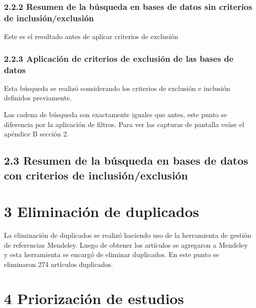 \subsubsection*{2.2.2 Resumen de la búsqueda en bases de datos sin criterios de inclusión/exclusión}
\label{subsubsec:resumenBusqueda}
Este es el resultado antes de aplicar criterios de exclusión




\subsubsection*{2.2.3	Aplicación de criterios de exclusión de las bases de datos}
Esta búsqueda se realizó considerando los criterios de exclusión e inclusión definidos previamente.

Las cadena de búsqueda son exactamente iguales que antes, este punto se diferencia por la aplicación de 
filtros. Para ver las capturas de pantalla veáse el apéndice B sección 2.

\subsection*{2.3 Resumen de la búsqueda en bases de datos con criterios de inclusión/exclusión}
\label{subsec:resumenBusquedaCriterios}




\section*{3 Eliminación de duplicados}
\label{sec:eliminacionDuplicados}
La eliminación de duplicados se realizó haciendo uso de la herramienta de gestión de referencias Mendeley. Luego de obtener los artículos se agregaron a Mendeley y esta herramienta se encargó de eliminar duplicados. En este punto se eliminaron 274 artículos duplicados.

\section*{4 Priorización de estudios}
\label{sec:priorizacionEstudios}

